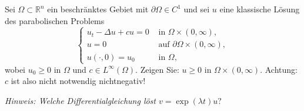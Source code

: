 
\begin{exercise}

Sei $\Omega \subset \mathbb{R}^{n}$ ein beschränktes Gebiet mit $\partial \Omega \in C^{1}$ und sei $u$ eine klassische Lösung des parabolischen Problems
$$
\left\{\begin{array}{ll}
u_{t}-\Delta u+c u=0 & \text { in } \Omega \times(0, \infty), \\
u=0 & \text { auf } \partial \Omega \times(0, \infty), \\
u(\cdot, 0)=u_{0} & \text { in } \Omega,
\end{array}\right.
$$
wobei $u_{0} \geq 0$ in $\Omega$ und $c \in L^{\infty}(\Omega) .$ Zeigen Sie: $u \geq 0$ in $\Omega \times(0, \infty) .$ Achtung: $c$ ist also nicht notwendig nichtnegativ!

\textit{Hinweis: Welche Differentialgleichung löst $v=\exp (\lambda t) u ?$}

\end{exercise}


